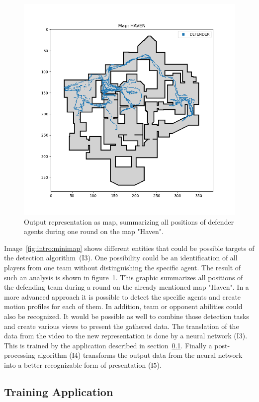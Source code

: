 \begin{figure}
	\centering
	\includegraphics[width=0.8\linewidth]{images/05-output}
	\caption[Output representation as map for defender.]{Output representation as map, summarizing all positions 
	of defender agents during one round on the map "Haven".}
	\label{fig:app:output}
\end{figure}

Image~\ref{fig:intro:minimap} shows different entities that could be possible targets of the detection 
algorithm~(I3). One possibility could be an identification of all players from one team without 
distinguishing the specific agent. The result of such an analysis is shown in 
figure~\ref{fig:app:output}. This graphic summarizes all positions of the defending team during a 
round on the already mentioned map "Haven". In a more advanced approach it is possible to detect 
the specific agents and create motion profiles for each of them. In addition, team or opponent 
abilities could also be recognized. It would be possible as well to combine those detection tasks and 
create various views to present the gathered data. The translation of the data from the video to the 
new representation is done by a neural network (I3). This is trained by the application described in 
section~\ref{subsec:app:trainingapp}. Finally a post-processing algorithm (I4) transforms the output 
data from the neural network into a better recognizable form of presentation (I5).

\subsection{Training Application}\label{subsec:app:trainingapp}

